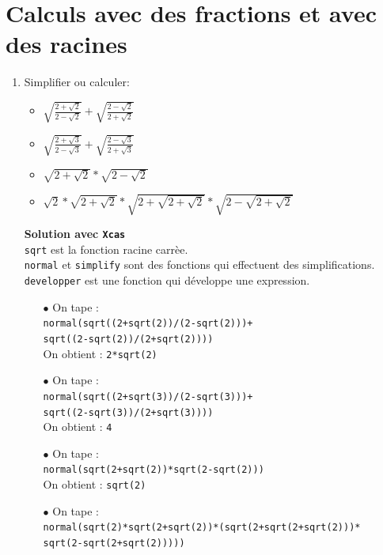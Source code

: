 \documentclass[a4paper,11pt]{book}
\begin{document}
\section{Calculs avec des fractions et avec des racines}
\begin{enumerate}
\item Simplifier ou calculer:
\begin{itemize}
\item $\displaystyle \sqrt{\frac{2+\sqrt 2}{2-\sqrt 2}}+\sqrt{\frac{2-\sqrt 2}{2+\sqrt 2}}$
\item $\displaystyle \sqrt{\frac{2+\sqrt 3}{2-\sqrt 3}}+\sqrt{\frac{2-\sqrt 3}{2+\sqrt 3}}$
\item $\displaystyle \sqrt{2+\sqrt 2}*\sqrt{2-\sqrt 2}$
\item $\displaystyle \sqrt2*\sqrt{2+\sqrt 2}*\sqrt{2+\sqrt{2+\sqrt 2}}*\sqrt{2-\sqrt{2+\sqrt 2}}$
\end{itemize}
{\bf Solution avec {\tt Xcas}}\\
{\tt sqrt} est la fonction racine carr\`ee.\\
{\tt normal} et {\tt simplify} sont des fonctions qui effectuent des 
simplifications.\\
{\tt developper} est une fonction qui d\'eveloppe une expression.
\begin{itemize}
\item[$\bullet$] On tape :\\
{\tt normal(sqrt((2+sqrt(2))/(2-sqrt(2)))+\\sqrt((2-sqrt(2))/(2+sqrt(2))))}\\
On obtient : {\tt 2*sqrt(2)}\\
\item[$\bullet$]On tape :\\
{\tt normal(sqrt((2+sqrt(3))/(2-sqrt(3)))+\\sqrt((2-sqrt(3))/(2+sqrt(3))))}\\
On obtient : {\tt 4}\\
\item[$\bullet$]On tape :\\
{\tt normal(sqrt(2+sqrt(2))*sqrt(2-sqrt(2)))}\\
On obtient : {\tt sqrt(2)}\\
\item[$\bullet$]On tape :\\
{\tt normal(sqrt(2)*sqrt(2+sqrt(2))*(sqrt(2+sqrt(2+sqrt(2)))*\\sqrt(2-sqrt(2+sqrt(2)))))}\\

\end{itemize}
\end{enumerate}
\end{document}
